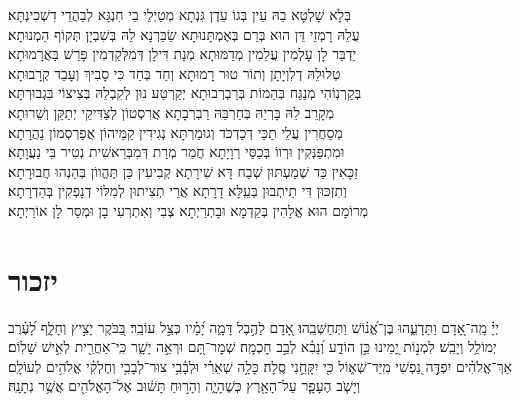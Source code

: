 {\begin{footnotesize}
\shatz
בְּלָא שָׁלְטָא בֵהּ עֵין בְּגוֹ עֵדֶן גִּנְתָא מְטַיְלֵי בֵי חִנְגָּא לְבַהֲדֵי דִשְׁכִינְתָּא׃\\
\kahal
עֲלֵהּ רָמְזֵי דֵּן הוּא בְּרַם בְּאֶמְתָּנוּתָא שַׂבַּרְנָא לֵהּ בְּשִׁבְיָן תְּקוֹף הֵמְנוּתָא׃\\
\shatz
יַדְבַּר לָן עָלְמִין עֲלֵמִין מְדַמּוּתָא מְנָת דִּילָן דְּמִלְּקַדְמִין פָּרֵשׁ בַּאֲרָמוּתָא׃\\
\kahal
טְלוּלֵהּ דְלִוְיָתָן וְתוֹר טוּר רָמוּתָא וְחַד בְּחַד כִּי סָבִיךְ וְעָבֵד קְרָבוּתָא׃\\
\shatz
בְּקַרְנֽוֹהִי מְנַגַּח בְּהֵמוֹת בְּרַבְרְבוּתָא יְקַרְטַע נוּן לְקִבְלֵהּ בְּצִיצוֹי בִּגְבוּרְתָּא׃\\
\kahal
מְקָרֵב לֵהּ בָּרְיֵהּ בְּחַרְבֵּהּ רַבְרְבָתָא אֲרִסְטוֹן לְצַדִּיקֵי יְתַקֵּן וְשֵׁרוּתָא׃\\
\shatz
מְסַחֲרִין עֲלֵי תַכֵּי דְכַדְכֹּד וְגוּמַרְתָּא נְגִידִין קַמֵּיהוֹן אֲפַרְסְמוֹן נַהֲרָתָא׃\\
\kahal
וּמִתְפַּנְּקִין וּרְווֹ בְּכַסֵּי רְוָיָתָא חֲמַר מְרַת דְּמִבְּרֵאשִׁית נְטִיר בֵּי נַעֲוָתָא׃\\
\shatz
זַכָּאִין כַּד שְׁמַעְתּוּן שְׁבַח דָּא שִׁירָתָא קְבִיעִין כֵּן תֶּהֱווֹן בְּהַנְהוּ חֲבוּרָתָא׃\\
\kahal
וְתִזְכּוּן דִּי תֵיתְבוּן בְּעֵֽלָּא דָרָתָא אֲרֵי תְצִיתוּן לְמִלּוֹי דְנָפְקִין בְּהַדְרָתָא׃\\
\shatz
מְרוֹמָם הוּא אֱלָהִין בְּקַדְמָא וּבָתְרַיְתָא צְבִי וְאִתְרְעִי בָן וּמְסַר לָן אוֹרַיְתָא׃\\ 
\end{footnotesize}

\section[יזכור]{ יזכור }


יְיָ֗ מָֽה־אָ֭דָם וַתֵּדָעֵ֑הוּ בֶּן־אֱ֝נ֗וֹשׁ וַתְּחַשְּׁבֵֽהוּ׃ אָ֭דָם לַהֶ֣בֶל דָּמָ֑ה יָ֝מָ֗יו כְּצֵ֣ל עוֹבֵֽר׃
בַּ֭בֹּקֶר יָצִ֣יץ וְחָלָ֑ף לָ֝עֶ֗רֶב יְמוֹלֵ֥ל וְיָבֵֽשׁ׃ לִמְנ֣וֹת יָ֭מֵינוּ כֵּ֣ן הוֹדַ֑ע וְ֝נָבִ֗א לְבַ֣ב חׇכְמָֽה׃
שְׁמׇר־תָּ֭ם וּרְאֵ֣ה יָשָׁ֑ר כִּֽי־אַחֲרִ֖ית לְאִ֣ישׁ שָׁלֽוֹם׃
אַךְ־אֱלֹהִ֗ים יִפְדֶּ֣ה נַ֭פְשִׁי מִֽיַּד־שְׁא֑וֹל כִּ֖י יִקָּחֵ֣נִי סֶֽלָה׃ 
כָּלָ֥ה שְׁאֵרִ֗י וּלְבָ֫בִ֥י צוּר־לְבָבִ֥י וְחֶלְקִ֗י אֱלֹהִ֥ים לְעוֹלָֽם׃ 
וְיָשֹׁ֧ב הֶעָפָ֛ר עַל־הָאָ֖רֶץ כְּשֶׁהָיָ֑ה וְהָר֣וּחַ תָּשׁ֔וּב אֶל־הָאֱלֹהִ֖ים אֲשֶׁ֥ר נְתָנָֽהּ׃

}
